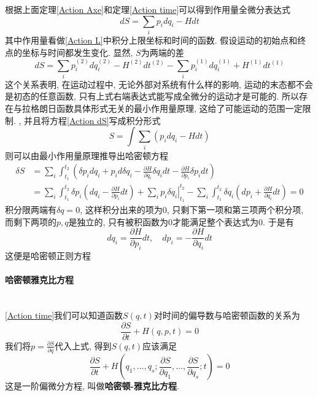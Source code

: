 \documentclass[a4paper,11pt]{article}
\begin{document}
根据上面定理\ref{Action Axe}和定理\ref{Action time}可以得到作用量全微分表达式
\begin{equation}\label{Action dS}
  dS=\sum_{i}p_idq_i-Hdt
\end{equation}
其中作用量看做\eqref{Action L}中积分上限坐标和时间的函数. 假设运动的初始点和终点的坐标与时间都发生变化. 显然, $S$为两端的差
\begin{equation*}
  dS=\sum_{i}p_i^{(2)}dq_i^{(2)}-H^{(2)}dt^{(2)}-\sum_{i}p_i^{(1)}dq_i^{(1)}+H^{(1)}dt^{(1)}
\end{equation*}
这个关系表明, 在运动过程中, 无论外部对系统有什么样的影响, 运动的末态都不会是初态的任意函数, 只有上式右端表达式能写成全微分的运动才是可能的. 所以存在与拉格朗日函数具体形式无关的最小作用量原理, 这给了可能运动的范围一定限制.
, 并且将方程\eqref{Action dS}写成积分形式
\begin{equation}\label{Action int}
  S=\int\sum_{i}\left(p_idq_i-Hdt\right)
\end{equation}
则可以由最小作用量原理推导出哈密顿方程
\begin{equation*}
\begin{split}
   \delta S&=\sum_{i}\int_{t_1}^{t_2}\left(\delta p_idq_i+p_id\delta q_i-\frac{\partial H}{\partial{q_i}}\delta q_idt-\frac{\partial H}{\partial p_i}\delta p_idt\right) \\
     &=\sum_{i}\int_{t_1}^{t_2}\delta p_i\left(dq_i-\frac{\partial H}{\partial{p_i}}dt\right)+\left.\sum_{i}p_i\delta q_i\right|_{t_1}^{t_2}-\sum_{i}\int_{t_1}^{t_2}\delta q_i\left(dp_i+\frac{\partial H}{\partial{q_i}}dt\right)=0
\end{split}
\end{equation*}
积分限两端有$\delta q=0$, 这样积分出来的项为$0$, 只剩下第一项和第三项两个积分项, 而剩下两项的$p,q$是独立的, 只有被积函数为$0$才能满足整个表达式为$0$. 于是有
\begin{equation*}
  dq_i=\frac{\partial H}{\partial{p_i}}dt,\quad dp_i=-\frac{\partial H}{\partial{q_i}}dt
\end{equation*}
这便是哈密顿正则方程
\paragraph*{哈密顿雅克比方程}\quad\\
\ref{Action time}我们可以知道函数$S(q,t)$对时间的偏导数与哈密顿函数的关系为
\begin{equation*}
  \frac{\partial S}{\partial t}+H(q,p,t)=0
\end{equation*}
我们将$p=\frac{\partial S}{\partial q}$代入上式, 得到$S(q,t)$应该满足
\begin{equation*}
  \frac{\partial S}{\partial t}+H(q_1,\dots,q_s;\frac{\partial S}{\partial{q_1}},\dots,\frac{\partial S}{\partial{q_s}};t)=0
\end{equation*}
这是一阶偏微分方程, 叫做\textbf{哈密顿-雅克比方程}.
\end{document}
